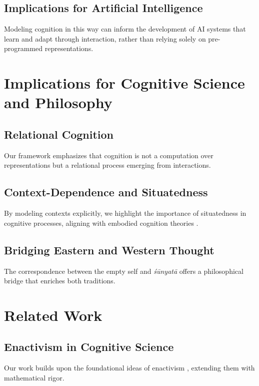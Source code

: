 \documentclass{article}
\begin{document}
\subsection{Implications for Artificial Intelligence}

Modeling cognition in this way can inform the development of AI systems that learn and adapt through interaction, rather than relying solely on pre-programmed representations.

\section{Implications for Cognitive Science and Philosophy}

\subsection{Relational Cognition}

Our framework emphasizes that cognition is not a computation over representations but a relational process emerging from interactions.

\subsection{Context-Dependence and Situatedness}






By modeling contexts explicitly, we highlight the importance of situatedness in cognitive processes, aligning with embodied cognition theories \cite{clark1997}.

\subsection{Bridging Eastern and Western Thought}

The correspondence between the empty self and \emph{śūnyatā} offers a philosophical bridge that enriches both traditions.

\section{Related Work}

\subsection{Enactivism in Cognitive Science}

Our work builds upon the foundational ideas of enactivism \cite{varela1991}, extending them with mathematical rigor.
\end{document}
